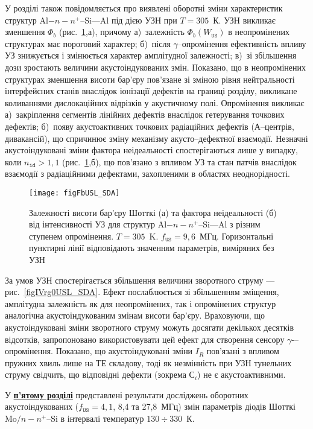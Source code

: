 У розділі також повідомляється про виявлені оборотні зміни характеристик структур Al$-n-n^+$--Si---Al під дією УЗН при $T\!=\!305$~К.
УЗН викликає зменшення $\Phi_b$ (рис.~\ref{figFbUSL_SDA},а), причому
а)~залежність $\Phi_b(W_\mathtt{US})$ в неопромінених структурах має пороговий характер;
б)~після $\gamma$--опромінення ефективність впливу УЗ знижується і змінюється характер амплітудної залежності;
в)~зі збільшення дози зростають величини акустоіндукованих змін.
Показано, що в неопромінених структурах зменшення висоти бар'єру пов'язане зі зміною рівня нейтральності інтерфейсних станів
внаслідок іонізації дефектів на границі розділу, викликане коливаннями дислокаційних відрізків у акустичному полі.
Опромінення викликає
а)~закріплення сегментів лінійних дефектів внаслідок гетерування точкових дефектів;
б)~появу акустоактивних точкових радіаційних дефектів (А--центрів, дивакансій),
що спричинює зміну механізму акусто--дефектної взаємодії.
Незначні акустоіндуковані зміни фактора неідеальності спостерігаються лише у випадку, коли $n_\mathtt{id}>1,1$ (рис.~\ref{figFbUSL_SDA},б),
що пов'язано з впливом УЗ та стан патчів внаслідок взаємодії з радіаційними дефектами, захопленими в областях неоднорідності.

\begin{figure}
\center
\texttt{[image: figFbUSL\_SDA]}
\caption{\label{figFbUSL_SDA}
Залежності висоти бар'єру Шотткі (а) та фактора неідеальності (б)  від інтенсивності УЗ для
структур Al$-n-n^+$--Si---Al з різним ступенем опромінення.
$T=305$~K.
$f_\mathtt{US}=9,6$~МГц.
Горизонтальні пунктирні лінії відповідають значенням параметрів, виміряних без УЗН
}%
\end{figure}

За умов УЗН спостерігається збільшення величини зворотного струму --- рис.~\ref{figIVrg0USL_SDA}.
Ефект послаблюється зі збільшенням зміщення, амплітудна залежність як для неопромінених, так і опромінених структур аналогічна акустоіндукованим змінам висоти бар'єру.
Враховуючи, що акустоіндуковані зміни зворотного струму можуть досягати декількох десятків відсотків,
запропоновано використовувати цей ефект для створення сенсору $\gamma$-–опромінення.
Показано, що акустоіндуковані зміни $I_R$ пов'язані з впливом пружних хвиль лише на ТЕ складову,
тоді як незмінність при УЗН тунельних струму свідчить, що відповідні дефекти (зокрема С$_i$) не є акустоактивними.


У  \underline{\textbf{п'ятому розділі}} представлені результати досліджень
оборотних акустоіндукованих ($f_\mathtt{US}=4,1$, 8,4 та 27,8~МГц) змін параметрів діодів Шотткі Mo$/n-n^+$--Si в інтервалі температур $130\div330$~К.

